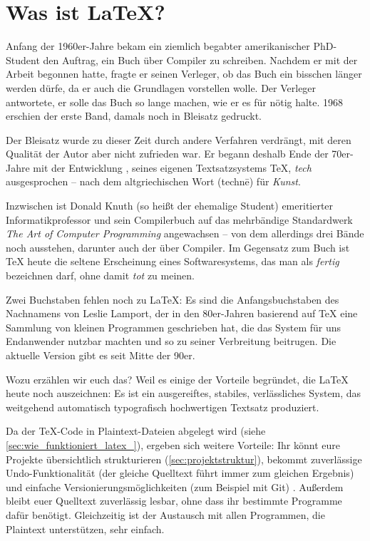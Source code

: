 \section{Was ist \LaTeX?}

Anfang der 1960er-Jahre bekam ein ziemlich begabter amerikanischer PhD-Student den Auftrag, ein Buch über Compiler zu schreiben.
Nachdem er mit der Arbeit begonnen hatte, fragte er seinen Verleger, ob das Buch ein bisschen länger werden dürfe, da er auch die Grundlagen vorstellen wolle.
Der Verleger antwortete, er solle das Buch so lange machen, wie er es für nötig halte.
1968 erschien der erste Band, damals noch in Bleisatz gedruckt.

Der Bleisatz wurde zu dieser Zeit durch andere Verfahren verdrängt, mit deren Qualität der Autor aber nicht zufrieden war. 
Er begann deshalb Ende der 70er-Jahre mit der Entwicklung , seines eigenen Textsatzsystems \TeX, \emph{tech} ausgesprochen – nach dem altgriechischen Wort \texttau\textepsilon{}\textchi\textnu\texteta{} (technē) für \emph{Kunst}.

Inzwischen ist Donald Knuth (so heißt der ehemalige Student) emeritierter Informatikprofessor und sein Compilerbuch auf das mehrbändige Standardwerk \emph{The Art of Computer Programming} angewachsen – von dem allerdings drei Bände noch ausstehen, darunter auch der über Compiler.
Im Gegensatz zum Buch ist \TeX{} heute die seltene Erscheinung eines Softwaresystems, das man als \emph{fertig} bezeichnen darf, ohne damit \emph{tot} zu meinen.

Zwei Buchstaben fehlen noch zu \LaTeX: 
Es sind die Anfangsbuchstaben des Nachnamens von Leslie Lamport, der in den 80er-Jahren basierend auf \TeX{} eine Sammlung von kleinen Programmen geschrieben hat, die das System für uns Endanwender nutzbar machten und so zu seiner Verbreitung beitrugen.
Die aktuelle Version \LaTeXe{} gibt es seit Mitte der 90er.

Wozu erzählen wir euch das? 
Weil es einige der Vorteile begründet, die \LaTeX{} heute noch auszeichnen:
Es ist ein ausgereiftes, stabiles, verlässliches System,
das weitgehend automatisch typografisch hochwertigen Textsatz produziert.

Da der \TeX-Code in Plaintext-Dateien abgelegt wird (siehe \cref{sec:wie_funktioniert_latex_}), ergeben sich weitere Vorteile:
Ihr könnt eure Projekte übersichtlich strukturieren (\cref{sec:projektstruktur}), bekommt zuverlässige Undo-Funktionalität (der gleiche Quelltext führt immer zum gleichen Ergebnis) und einfache Versionierungsmöglichkeiten (zum Beispiel mit Git)$ $  $ $.
Außerdem bleibt euer Quelltext zuverlässig lesbar, ohne dass ihr bestimmte Programme dafür benötigt.
Gleichzeitig ist der Austausch mit allen Programmen, die Plaintext unterstützen, sehr einfach.

